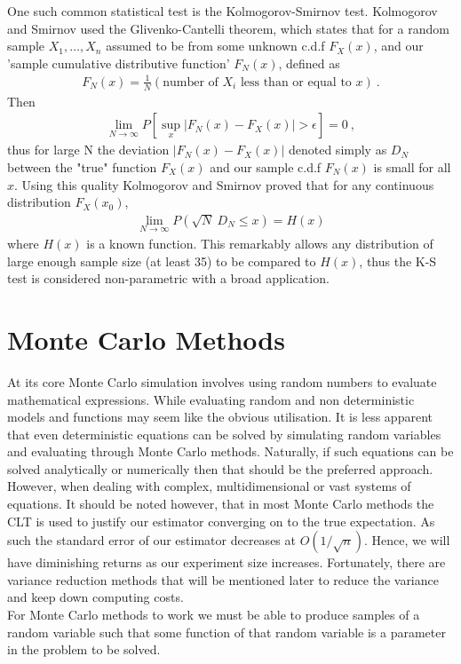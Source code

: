 \documentclass{article}
\begin{document}
One such common statistical test is the Kolmogorov-Smirnov test. 
Kolmogorov and Smirnov used the Glivenko-Cantelli theorem, 
which states that for a random sample $X_{1},\dots,X_{n}$ assumed to be 
from some unknown c.d.f $F_{X}(x)$, and our  'sample cumulative distributive 
function' $F_{N}(x)$, defined as 
\begin{align}
F_{N}(x)=\frac{1}{N}(\text{number of $X_{i}$ less than or equal to $x$}) ~.
\end{align}
Then
\begin{align}
\lim_{ N \to \infty } P\left[\sup_{x} |F_{N}(x)-F_{X}(x)|>\epsilon\right]  = 0 ~,
\end{align}
thus for large N the deviation $|F_{N}(x)-F_{X}(x)|$ denoted simply as $D_{N}$ between the "true" function $F_{X}(x)$ and our sample c.d.f $F_{N}(x)$ is small for all $x$.
Using this quality Kolmogorov and Smirnov proved that for any continuous distribution $F_{X}(x_{0})$, 
\begin{align}
\lim_{ N \to \infty } P(\sqrt{ N }~D_{N}\leq x)=H(x)
\end{align}
where $H(x)$ is a known function.
This remarkably allows any distribution of large enough sample size 
(at least 35) to be compared to $H(x)$, thus the K-S test is considered 
non-parametric with a broad application. \cite{alma9954732790001381}

\section{Monte Carlo Methods}
At its core Monte Carlo simulation involves using random numbers to evaluate mathematical expressions. While evaluating random and non deterministic models and functions may seem like the obvious utilisation. It is less apparent that even deterministic equations can be solved by simulating random variables and evaluating through Monte Carlo methods. Naturally, if such equations can be solved analytically or numerically then that should be the preferred approach. However, when dealing with complex, multidimensional or vast systems of equations. It should be noted however, that in most Monte Carlo methods the CLT is used to justify our estimator converging on to the true expectation. As such the standard error of our estimator decreases at $O\left( 1/\sqrt{ n } \right)$. Hence, we will have diminishing returns as our experiment size increases. Fortunately, there are variance reduction methods that will be mentioned later to reduce the variance and keep down computing costs. \cite{alma9946168020001381} 
\\
For Monte Carlo methods to work we must be able to produce samples of a random variable such that some function of that random variable is a parameter in the problem to be solved. 
\end{document}
